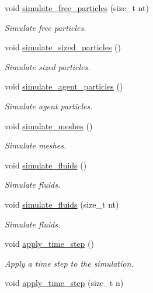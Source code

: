 \begin{DoxyCompactItemize}
void \hyperlink{classphysim_1_1simulator_af4c6a7a02feeb89263fa557a1ea3de7e}{simulate\+\_\+free\+\_\+particles} (size\+\_\+t nt)
\begin{DoxyCompactList}\small\item\em Simulate free particles. \end{DoxyCompactList}\item 
void \hyperlink{classphysim_1_1simulator_ac99a02f99b4f83501478093d402abea5}{simulate\+\_\+sized\+\_\+particles} ()
\begin{DoxyCompactList}\small\item\em Simulate sized particles. \end{DoxyCompactList}\item 
void \hyperlink{classphysim_1_1simulator_a99dbf5870ec5383266f87e60c1686049}{simulate\+\_\+agent\+\_\+particles} ()
\begin{DoxyCompactList}\small\item\em Simulate agent particles. \end{DoxyCompactList}\item 
void \hyperlink{classphysim_1_1simulator_aea4165314f9285dfc3b64ba9a2666aaf}{simulate\+\_\+meshes} ()
\begin{DoxyCompactList}\small\item\em Simulate meshes. \end{DoxyCompactList}\item 
void \hyperlink{classphysim_1_1simulator_a63f7f4b59a79b8b294aaa6d8870fccd2}{simulate\+\_\+fluids} ()
\begin{DoxyCompactList}\small\item\em Simulate fluids. \end{DoxyCompactList}\item 
void \hyperlink{classphysim_1_1simulator_acb3359c9faedfc69191bf9a4618eebfa}{simulate\+\_\+fluids} (size\+\_\+t nt)
\begin{DoxyCompactList}\small\item\em Simulate fluids. \end{DoxyCompactList}\item 
void \hyperlink{classphysim_1_1simulator_a1bef71687a4b46373753847a5d2112ff}{apply\+\_\+time\+\_\+step} ()
\begin{DoxyCompactList}\small\item\em Apply a time step to the simulation. \end{DoxyCompactList}\item 
void \hyperlink{classphysim_1_1simulator_a5bee70bb8d7f0744e47f1ae76b3c8189}{apply\+\_\+time\+\_\+step} (size\+\_\+t n)

\end{DoxyCompactItemize}
